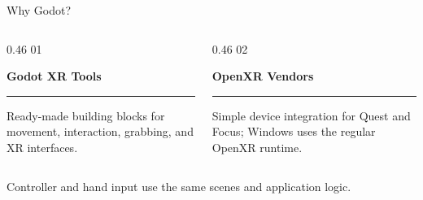 \begin{frame}[c]{Why Godot?}
\begin{columns}[T,onlytextwidth]
  \begin{column}{0.46\textwidth}
    \textcolor{unired}{\LARGE 01}

    \vspace{0.10cm}
    \Large\textbf{Godot XR Tools}

    \vspace{0.14cm}
    \color{unimint}\rule{\linewidth}{1.6pt}
    \color{black}

    \vspace{0.28cm}
    \large
    Ready-made building blocks for movement, interaction, grabbing, and XR interfaces.
  \end{column}

  \begin{column}{0.46\textwidth}
    \textcolor{unired}{\LARGE 02}

    \vspace{0.10cm}
    \Large\textbf{OpenXR Vendors}

    \vspace{0.14cm}
    \color{unimint}\rule{\linewidth}{1.6pt}
    \color{black}

    \vspace{0.28cm}
    \large
    Simple device integration for Quest and Focus; Windows uses the regular OpenXR runtime.
  \end{column}
\end{columns}

\vspace{0.65cm}
\centering
\small
Controller and hand input use the same scenes and application logic.
\end{frame}
